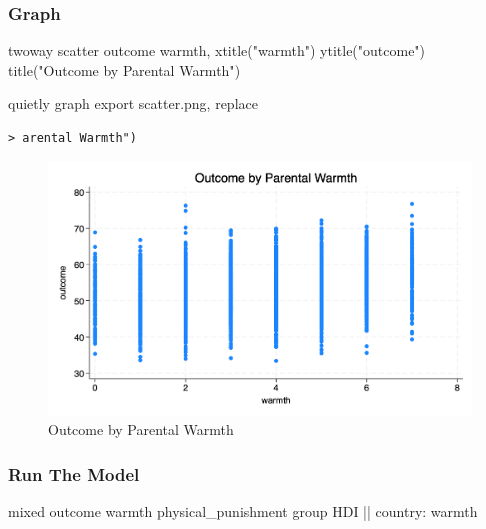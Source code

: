 \documentclass[
  letterpaper,
  DIV=11,
  numbers=noendperiod,
  oneside]{scrreprt}
\newenvironment{Shaded}{\begin{snugshade}}{\end{snugshade}}
\newcommand{\BaseNTok}[1]{\textcolor[rgb]{0.68,0.00,0.00}{#1}}
\newcommand{\FunctionTok}[1]{\textcolor[rgb]{0.28,0.35,0.67}{#1}}
\newcommand{\KeywordTok}[1]{\textcolor[rgb]{0.00,0.23,0.31}{#1}}
\newcommand{\NormalTok}[1]{\textcolor[rgb]{0.00,0.23,0.31}{#1}}
\newcommand{\StringTok}[1]{\textcolor[rgb]{0.13,0.47,0.30}{#1}}
\begin{document}
\hypertarget{graph}{%
\subsubsection{Graph}\label{graph}}

\begin{Shaded}
\begin{Highlighting}[]
\KeywordTok{twoway} \KeywordTok{scatter}\NormalTok{ outcome warmth, }\BaseNTok{xtitle}\NormalTok{(}\StringTok{"warmth"}\NormalTok{) }\BaseNTok{ytitle}\NormalTok{(}\StringTok{"outcome"}\NormalTok{) }\BaseNTok{title}\NormalTok{(}\StringTok{"Outcome by Parental Warmth"}\NormalTok{) }

\KeywordTok{quietly} \KeywordTok{graph} \KeywordTok{export} \KeywordTok{scatter}\NormalTok{.png, }\KeywordTok{replace}
\end{Highlighting}
\end{Shaded}

\begin{verbatim}
> arental Warmth") 
\end{verbatim}

\begin{figure}

{\centering \includegraphics{scatter.png}

}

\caption{Outcome by Parental Warmth}

\end{figure}

\hypertarget{run-the-model}{%
\subsubsection{Run The Model}\label{run-the-model}}

\begin{Shaded}
\begin{Highlighting}[]

\NormalTok{mixed outcome warmth physical\_punishment }\FunctionTok{group}\NormalTok{ HDI || country: warmth}
\end{Highlighting}
\end{Shaded}
\end{document}
